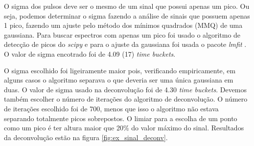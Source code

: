 \documentclass[a4paper,12pt,oneside]{book}
\begin{document}
\par O sigma dos pulsos deve ser o mesmo de um sinal que possui apenas um pico. Ou seja, podemos determinar o sigma fazendo a análise de sinais que possuem apenas 1 pico, fazendo um ajuste pelo método dos mínimos quadrados (MMQ) de uma gaussiana. Para buscar espectros com apenas um pico foi usado o algoritmo de detecção de picos do \textit{scipy}\cite{scipy} e para o ajuste da gaussiana foi usada o pacote \textit{lmfit} \cite{lmfit}. O valor de sigma encotrado foi de 4.09 (17) \textit{time buckets}.

\par O sigma escolhido foi ligeiramente maior pois, verificando empiricamente, em alguns casos o algoritmo separava o que deveria ser uma única gaussiana em duas. O valor de sigma usado na deconvolução foi de 4.30 \textit{time buckets}. Devemos também escolher o número de iterações do algoritmo de deconvolução. O número de iterações escolhido foi de 700, menos que isso o algoritmo não estava separando totalmente picos sobrepostos. O limiar para a escolha de um ponto como um pico é ter altura maior que 20\% do valor máximo do sinal. Resultados da deconvolução estão na figura \ref{fig:ex_sinal_deconv}.
\end{document}
